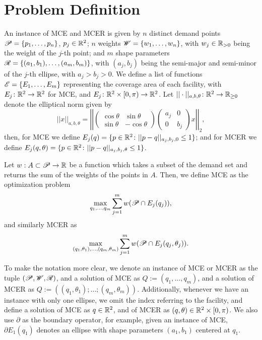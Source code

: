 	\section{Problem Definition}
	
	An instance of MCE and MCER is given by $n$ distinct demand points $\mathscr{P}=\{p_1, \dots, p_n\}$, $p_j\in\mathbb{R}^2$; $n$ weights $\mathscr{W}=\{w_1, \dots, w_n\}$, with $w_j\in\mathbb{R}_{>0}$ being the weight of the $j$-th point; and $m$ shape parameters $\mathscr{R}=\{(a_1, b_1), \dots, (a_m, b_m)\}$, with $(a_j, b_j)$ being the semi-major and semi-minor of the $j$-th ellipse, with $a_j > b_j > 0$. We define a list of functions $\mathscr{E}=\{E_1, \dots, E_m\}$ representing the coverage area of each facility, with $E_j \colon \mathbb{R}^2 \to \mathbb{R}^2$ for MCE, and $E_j \colon \mathbb{R}^2\times [0, \pi)\to \mathbb{R}^2$. Let $||\cdot||_{a,b, \theta} \colon \mathbb{R}^2 \to \mathbb{R}_{\ge0}$ denote the elliptical norm given by
	\begin{equation}
	||x||_{a,b, \theta}=\left|\left|
	\left(\begin{array}{rr}
	\cos{\theta} & \sin{\theta}\\
	\sin{\theta} & -\cos{\theta}
	\end{array}
	\right)
	\left(\begin{array}{cc}
	a_j & 0\\
	0 & b_j
	\end{array}\right) x \right|\right|_2,
	\end{equation}
	then, for MCE we define $E_j(q)=\{p \in \mathbb{R}^2 \colon ||p-q||_{a_j,b_j,0} \le 1\}$; and for MCER we define $E_j(q, \theta)=\{p \in \mathbb{R}^2 \colon ||p-q||_{a_j,b_j, \theta} \le 1\}$.
	
Let $w : A \subset \mathscr{P} \to \mathbb{R}$ be a function which takes a subset of the demand set and returns the sum of the weights of the points in $A$. Then, we define MCE as the optimization problem 
\begin{equation}
\max_{q_1, \dots, q_m} \sum_{j=1}^m w(\mathscr{P} \cap E_j(q_j)),
\end{equation}
and similarly MCER as
\begin{equation}
\max_{(q_1, \theta_1), \dots, (q_m, \theta_m)} \sum_{j=1}^m w(\mathscr{P} \cap E_j(q_j, \theta_j)).
\end{equation}

To make the notation more clear, we denote an instance of MCE or MCER as the tuple $(\mathscr{P}, \mathscr{W}, \mathscr{R})$, and a solution of MCE as $Q:=(q_1, \dots, q_m)$, and a solution of MCER as $Q:=((q_1, \theta_1); \dots; (q_m, \theta_m))$. Additionally, whenever we have an instance with only one ellipse, we omit the index referring to the facility, and define a solution of MCE as $q\in\mathbb{R}^2$, and of MCER as $(q, \theta) \in \mathbb{R}^2\times [0, \pi)$.
We also use $\partial$ as the boundary operator, for example, given an instance of MCE, $\partial E_1(q_1)$ denotes an ellipse with shape parameters $(a_1, b_1)$ centered at $q_1$.

